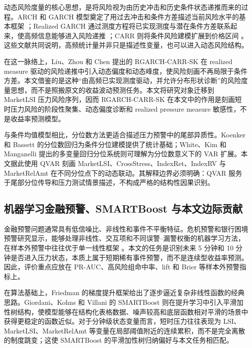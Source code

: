 动态风险度量的核心思想，是将风险视为由历史冲击和历史条件状态递推而来的过程。ARCH 和 GARCH 模型奠定了用过去冲击和条件方差描述当前风险水平的基本框架 \cite{engle1982arch,bollerslev1986garch}；Realized GARCH 通过测度方程将已实现测度与潜在条件方差联系起来，使高频信息能够进入风险递推 \cite{hansen2012realizedgarch}；CARR 则将条件风险建模扩展到价格区间 \cite{chou2005carr}。这些文献共同说明，高频统计量并非只是描述性变量，也可以进入动态风险结构。

在这一脉络上，Liu、Zhou 和 Chen \cite{liu2025rgarchcarrsk} 提出的 RGARCH-CARR-SK 在 realized measure 驱动的风险递推中引入动态偏度和动态峰度，使风险刻画不再局限于条件方差。本文借鉴的是这种“由高频已实现测度驱动，并允许分布形状诊断”的风险度量思想，而不是照搬原文的收益波动预测任务。本文将研究对象迁移到 MarketLSI 压力风险序列，因而 RGARCH-CARR-SK 在本文中的作用是刻画短时压力风险的阶段性聚集、动态偏度诊断和 realized pressure measure 敏感性，不是收益率预测模型。

与条件均值模型相比，分位数方法更适合描述压力预警中的尾部异质性。Koenker 和 Bassett \cite{koenker1978rq} 的分位数回归为条件分位建模提供了统计基础；White、Kim 和 Manganelli \cite{white2015varforvar} 提出的多变量回归分位系统则可理解为分位数意义下的 VAR 扩展。本文据此使用 QVAR 刻画 MarketLSI、CrossStress、IndexRet、IndexRV 与 MarketRelAmt 在不同分位点下的动态联动。其解释边界必须明确：QVAR 服务于尾部分位传导和压力测试情景描述，不构成严格的结构性因果识别。

\subsection{机器学习金融预警、SMARTBoost 与本文边际贡献}

金融预警问题通常具有低信噪比、非线性和事件不平衡特征。危机预警和银行困境预警研究显示，能够处理非线性、交互项和不同误警--漏警权衡的机器学习方法，在样本外预警中往往优于单一线性框架 \cite{holopainen2016earlywarning,suss2019bankdistress}。本文的任务是识别未来 5 分钟和 10 分钟是否进入压力状态，本质上属于短期稀有事件预警，而不是连续型收益率预测。因此，评价重点应放在 PR-AUC、高风险组命中率、lift 和 Brier 等样本外预警指标上。

在算法基础上，Friedman \cite{friedman2001gbm} 的梯度提升框架给出了逐步逼近复杂非线性函数的经典思路。Giordani、Kohns 和 Villani \cite{giordani2025smartboost} 的 SMARTBoost 则在提升学习中引入平滑加性树结构，使模型能够在结构化表格数据、噪声较高和底层函数相对平滑的场景中获得更稳定的函数近似。对于分钟级状态变量而言，短时压力往往表现为 LSI、MarketLSI、MarketRelAmt 等变量在局部阈值附近的连续累积，而不是完全离散的制度跳变；这使 SMARTBoost 的平滑加性树归纳偏好与本文任务相匹配。

